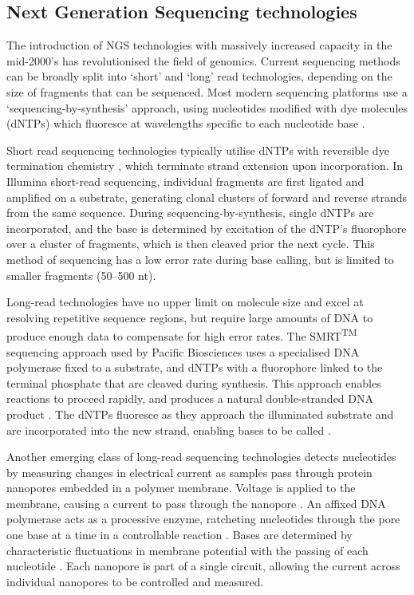\subsection{Next Generation Sequencing technologies}
The introduction of NGS technologies with massively increased capacity in the mid-2000’s has revolutionised the field of genomics. Current sequencing methods can be broadly split into ‘short’ and ‘long’ read technologies, depending on the size of fragments that can be sequenced. Most modern sequencing platforms use a ‘sequencing-by-synthesis’ approach, using nucleotides modified with dye molecules (dNTPs) which fluoresce at wavelengths specific to each nucleotide base \citep{Eid2009-gt,Bentley2008-xb}.\par
Short read sequencing technologies typically utilise dNTPs with reversible dye termination chemistry \citep{Bentley2008-xb,Croucher2009-iw}, which terminate strand extension upon incorporation. In Illumina short-read sequencing, individual fragments are first ligated and amplified on a substrate, generating clonal clusters of forward and reverse strands from the same sequence. During sequencing-by-synthesis, single dNTPs are incorporated, and the base is determined by excitation of the dNTP's fluorophore over a cluster of fragments, which is then cleaved prior the next cycle. This method of sequencing has a low error rate during base calling, but is limited to smaller fragments (50--500 nt). \par
Long-read technologies have no upper limit on molecule size and excel at resolving repetitive sequence regions, but require large amounts of DNA to produce enough data to compensate for high error rates. The SMRT\textsuperscript{TM} sequencing approach used by Pacific Biosciences uses a specialised DNA polymerase fixed to a substrate, and dNTPs with a fluorophore linked to the terminal phosphate that are cleaved during synthesis. This approach enables reactions to proceed rapidly, and produces a natural double-stranded DNA product \citep{Korlach2010-dj}. The dNTPs fluoresce as they approach the illuminated substrate and are incorporated into the new strand, enabling bases to be called \citep{Eid2009-gt}.\par
Another emerging class of long-read sequencing technologies detects nucleotides by measuring changes in electrical current as samples pass through protein nanopores embedded in a polymer membrane. Voltage is applied to the membrane, causing a current to pass through the nanopore \citep{Jain2016-hk,Feng2015-ut}. An affixed  DNA polymerase acts as a processive enzyme, ratcheting nucleotides through the pore one base at a time in a controllable reaction \citep{Cherf2012-jh}. Bases are determined by characteristic fluctuations in membrane potential with the passing of each nucleotide \citep{Stoddart2009-bo}. Each nanopore is part of a single circuit, allowing the current across individual nanopores to be controlled and measured.\par
